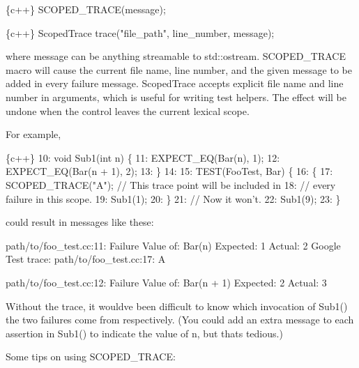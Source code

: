 \begin{DoxyCode}
\{c++\}
SCOPED\_TRACE(message);
\end{DoxyCode}



\begin{DoxyCode}
\{c++\}
ScopedTrace trace("file\_path", line\_number, message);
\end{DoxyCode}


where {\ttfamily message} can be anything streamable to {\ttfamily std\+::ostream}. {\ttfamily S\+C\+O\+P\+E\+D\+\_\+\+T\+R\+A\+CE} macro will cause the current file name, line number, and the given message to be added in every failure message. {\ttfamily Scoped\+Trace} accepts explicit file name and line number in arguments, which is useful for writing test helpers. The effect will be undone when the control leaves the current lexical scope.

For example,


\begin{DoxyCode}
\{c++\}
10: void Sub1(int n) \{
11:   EXPECT\_EQ(Bar(n), 1);
12:   EXPECT\_EQ(Bar(n + 1), 2);
13: \}
14:
15: TEST(FooTest, Bar) \{
16:   \{
17:     SCOPED\_TRACE("A");  // This trace point will be included in
18:                         // every failure in this scope.
19:     Sub1(1);
20:   \}
21:   // Now it won't.
22:   Sub1(9);
23: \}
\end{DoxyCode}


could result in messages like these\+:


\begin{DoxyCode}
path/to/foo\_test.cc:11: Failure
Value of: Bar(n)
Expected: 1
  Actual: 2
Google Test trace:
path/to/foo\_test.cc:17: A

path/to/foo\_test.cc:12: Failure
Value of: Bar(n + 1)
Expected: 2
  Actual: 3
\end{DoxyCode}


Without the trace, it would\textquotesingle{}ve been difficult to know which invocation of {\ttfamily Sub1()} the two failures come from respectively. (You could add an extra message to each assertion in {\ttfamily Sub1()} to indicate the value of {\ttfamily n}, but that\textquotesingle{}s tedious.)

Some tips on using {\ttfamily S\+C\+O\+P\+E\+D\+\_\+\+T\+R\+A\+CE}\+:


